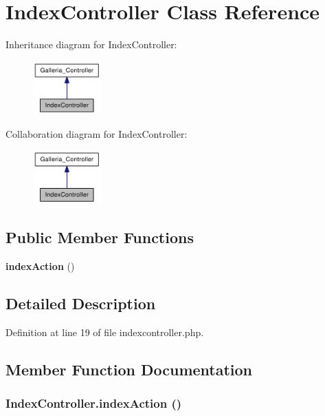 \section{IndexController Class Reference}
\label{classIndexController}
Inheritance diagram for IndexController:\nopagebreak
\begin{figure}[H]
\begin{center}
\leavevmode
\includegraphics[width=74pt]{classIndexController__inherit__graph}
\end{center}
\end{figure}
Collaboration diagram for IndexController:\nopagebreak
\begin{figure}[H]
\begin{center}
\leavevmode
\includegraphics[width=74pt]{classIndexController__coll__graph}
\end{center}
\end{figure}
\subsection*{Public Member Functions}
\begin{CompactItemize}
\item 
{\bf indexAction} ()
\end{CompactItemize}


\subsection{Detailed Description}


Definition at line 19 of file indexcontroller.php.

\subsection{Member Function Documentation}
\subsubsection{\setlength{\rightskip}{0pt plus 5cm}IndexController.indexAction ()}\label{classIndexController_c276caea218a4e9283c6d1d7317e66e0}


